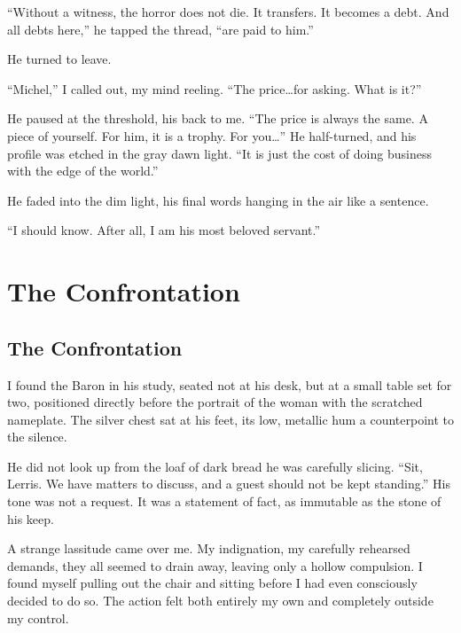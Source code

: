 \documentclass[11pt]{article}
\begin{document}
``Without a witness, the horror does not die. It transfers. It becomes a debt. And all debts here,'' he tapped the thread, ``are paid to him.''

\vspace{0.5em}
\noindent
{}

He turned to leave.

``Michel,'' I called out, my mind reeling. ``The price\dots for asking. What is it?''

He paused at the threshold, his back to me. ``The price is always the same. A piece of yourself. For him, it is a trophy. For you\dots'' He half-turned, and his profile was etched in the gray dawn light. ``It is just the cost of doing business with the edge of the world.''

He faded into the dim light, his final words hanging in the air like a sentence.

``I should know. After all, I am his most beloved servant.''

\newpage

\section*{The Confrontation}

\subsection*{The Confrontation}

I found the Baron in his study, seated not at his desk, but at a small table set for two, positioned directly before the portrait of the woman with the scratched nameplate. The silver chest sat at his feet, its low, metallic hum a counterpoint to the silence.

He did not look up from the loaf of dark bread he was carefully slicing. ``Sit, Lerris. We have matters to discuss, and a guest should not be kept standing.'' His tone was not a request. It was a statement of fact, as immutable as the stone of his keep.

A strange lassitude came over me. My indignation, my carefully rehearsed demands, they all seemed to drain away, leaving only a hollow compulsion. I found myself pulling out the chair and sitting before I had even consciously decided to do so. The action felt both entirely my own and completely outside my control.
\end{document}
